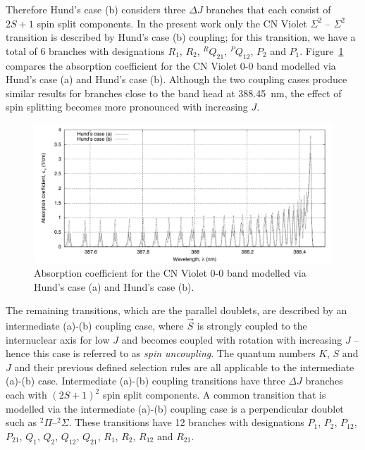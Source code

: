 Therefore Hund's case (b) considers three $\Delta J$ branches that each consist of $2S+1$ spin split components.
In the present work only the CN Violet $\Sigma^2$ -- $\Sigma^2$ transition is described by Hund's case (b) coupling; for this transition, we have a total of 6 branches with designations $R_1$, $R_2$, $^{R}Q_{21}$, $^{P}Q_{12}$, $P_2$ and $P_1$.
Figure~\ref{fig:Violet_a_vs_b} compares the absorption coefficient for the CN Violet 0-0 band modelled via Hund's case (a) and Hund's case (b).
Although the two coupling cases produce similar results for branches close to the band head at 388.45~nm, the effect of spin splitting becomes more pronounced with increasing $J$.

\begin{figure}[htb]
 \includegraphics[width=\linewidth]{spectral-modelling/figures/CN_violet_absorption_coefficient_spectra_linear.pdf}
 \caption{Absorption coefficient for the CN Violet 0-0 band modelled via Hund's case (a) and Hund's case (b).}
 \label{fig:Violet_a_vs_b}
\end{figure}

\par


The remaining transitions, which are the parallel doublets, are described by an intermediate (a)-(b) coupling case, where $\vec{S}$ is strongly coupled to the internuclear axis for low $J$ and becomes coupled with rotation with increasing $J$ -- hence this case is referred to as \textit{spin uncoupling}.
The quantum numbers $K$, $S$ and $J$ and their previous defined selection rules are all applicable to the intermediate (a)-(b) case.
Intermediate (a)-(b) coupling transitions have three $\Delta J$ branches each with $\left( 2S + 1 \right)^2$ spin split components.
A common transition that is modelled via the intermediate (a)-(b) coupling case is a perpendicular doublet such as $^2 \Pi$--$^2 \Sigma$.
These transitions have 12 branches with designations $P_{1}$, $P_2$, $P_{12}$, $P_{21}$, $Q_{1}$, $Q_2$, $Q_{12}$, $Q_{21}$, $R_{1}$, $R_2$, $R_{12}$ and $R_{21}$.

